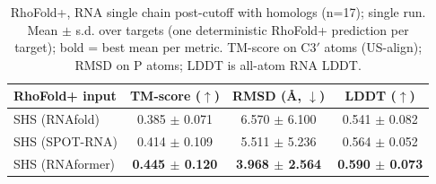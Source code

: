 \begin{table}[htbp]
\centering
\caption{RhoFold+, RNA single chain post-cutoff with homologs (n=17); single run. Mean $\pm$ s.d. over targets (one deterministic RhoFold+ prediction per target); bold = best mean per metric. TM-score on C3$'$ atoms (US-align); RMSD on P atoms; LDDT is all-atom RNA LDDT.}
\label{tab:rf_rna_single_chain_post_cutoff_with_homologs}
\begin{tabular}{lccc}
\toprule
RhoFold+ input & TM-score ($\uparrow$) & RMSD (\AA, $\downarrow$) & LDDT ($\uparrow$) \\
\midrule
SHS (RNAfold) & 0.385 $\pm$ 0.071 & 6.570 $\pm$ 6.100 & 0.541 $\pm$ 0.082 \\
SHS (SPOT-RNA) & 0.414 $\pm$ 0.109 & 5.511 $\pm$ 5.236 & 0.564 $\pm$ 0.052 \\
SHS (RNAformer) & \textbf{0.445 $\pm$ 0.120} & \textbf{3.968 $\pm$ 2.564} & \textbf{0.590 $\pm$ 0.073} \\
\bottomrule
\end{tabular}
\end{table}
